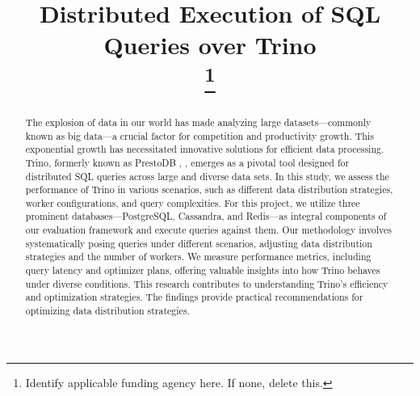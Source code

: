 \documentclass[conference]{IEEEtran}
\begin{document}
\title{Distributed Execution of SQL Queries over Trino \\
	\thanks{Identify applicable funding agency here. If none, delete this.}
}

\author{
	\and
}

\maketitle

\begin{abstract}

	The explosion of data in our world has made analyzing large datasets—commonly known as big data—a
	crucial factor for competition and productivity growth. This exponential growth has necessitated
	innovative solutions for efficient data processing. Trino, formerly known as PrestoDB \cite{b1}, \cite{b2}, emerges as
	a pivotal tool designed for distributed SQL queries across large and diverse data sets. In this
	study, we assess the performance of Trino in various scenarios, such as different data distribution
	strategies,  worker configurations, and query complexities. For this project, we utilize three
	prominent databases—PostgreSQL, Cassandra, and Redis—as integral components of our evaluation
	framework and execute queries against them. Our methodology involves systematically posing queries
	under different scenarios, adjusting data distribution strategies and the number of workers. We
	measure performance metrics, including query latency and optimizer plans, offering valuable insights
	into how Trino behaves under diverse conditions. This research contributes to understanding Trino's
	efficiency and optimization strategies. The findings provide practical recommendations for optimizing
	data distribution strategies.

\end{abstract}
\end{document}
